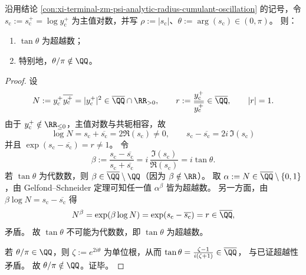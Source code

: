 \begin{theorem}\label{thm:xi-terminal-zm-leyang-oscillation-angle-transcendence}
沿用结论 \ref{con:xi-terminal-zm-psi-analytic-radius-cumulant-oscillation} 的记号，令
\(
s_{\mathrm c}:=s_{\mathrm c}^{+}=\log y_{\mathrm c}^{+}
\)
为主值对数，并写 \(\rho:=|s_{\mathrm c}|\)、\(\theta:=\arg(s_{\mathrm c})\in(0,\pi)\)。
则：
\begin{enumerate}
  \item \(\tan\theta\) 为超越数；
  \item 特别地，\(\theta/\pi\notin\QQ\)。
\end{enumerate}
\end{theorem}
\begin{proof}
设
\[
N:=y_{\mathrm c}^{+}\overline{y_{\mathrm c}^{+}}=|y_{\mathrm c}^{+}|^{2}\in\overline{\QQ}\cap\RR_{>0},
\qquad
r:=\frac{y_{\mathrm c}^{+}}{\overline{y_{\mathrm c}^{+}}}\in\overline{\QQ},
\qquad |r|=1.
\]
由于 \(y_{\mathrm c}^{+}\notin\RR_{\le 0}\)，主值对数与共轭相容，故
\[
\log N=s_{\mathrm c}+\overline{s_{\mathrm c}}=2\Re(s_{\mathrm c})\neq 0,
\qquad
s_{\mathrm c}-\overline{s_{\mathrm c}}=2i\,\Im(s_{\mathrm c})
\]
并且 \(\exp(s_{\mathrm c}-\overline{s_{\mathrm c}})=r\neq 1\)。
令
\[
\beta:=\frac{s_{\mathrm c}-\overline{s_{\mathrm c}}}{s_{\mathrm c}+\overline{s_{\mathrm c}}}
=i\,\frac{\Im(s_{\mathrm c})}{\Re(s_{\mathrm c})}=i\tan\theta.
\]
若 \(\tan\theta\) 为代数数，则 \(\beta\in\overline{\QQ}\setminus\QQ\)（因为 \(\beta\notin\RR\)）。
取 \(\alpha:=N\in\overline{\QQ}\setminus\{0,1\}\)，由 Gelfond--Schneider 定理可知任一值 \(\alpha^{\beta}\) 皆为超越数。\cite{Baker1975TranscendentalNumberTheory}
另一方面，由 \(\beta\log N=s_{\mathrm c}-\overline{s_{\mathrm c}}\) 得
\[
N^{\beta}=\exp(\beta\log N)=\exp(s_{\mathrm c}-\overline{s_{\mathrm c}})=r\in\overline{\QQ},
\]
矛盾。
故 \(\tan\theta\) 不可能为代数数，即 \(\tan\theta\) 为超越数。
\par
若 \(\theta/\pi\in\QQ\)，则 \(\zeta:=e^{2i\theta}\) 为单位根，从而
\(
\tan\theta=\frac{\zeta-1}{i(\zeta+1)}
\in\overline{\QQ}
\)，
与已证超越性矛盾。
故 \(\theta/\pi\notin\QQ\)。证毕。
\end{proof}

